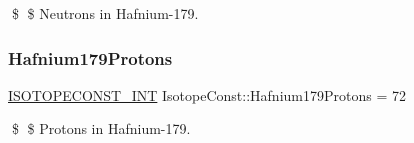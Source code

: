 \$ \$ Neutrons in Hafnium-\/179. \mbox{\label{group___isotope_const-_hafnium-_hf179_gababad464bb689660fa6e010227a62306}} 
\subsubsection{\texorpdfstring{Hafnium179\+Protons}{Hafnium179Protons}}
{\footnotesize\ttfamily \mbox{\hyperlink{group___isotope_const-_macros_ga5f18360b3e99483a35c32d789e62621c}{I\+S\+O\+T\+O\+P\+E\+C\+O\+N\+S\+T\+\_\+\+I\+NT}} Isotope\+Const\+::\+Hafnium179\+Protons = 72}

\$ \$ Protons in Hafnium-\/179. 